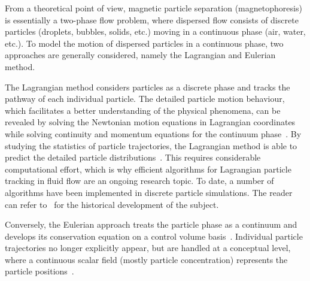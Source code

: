 From a theoretical point of view, magnetic particle separation (magnetophoresis) is essentially a two-phase flow problem, where dispersed flow consists of discrete particles (droplets, bubbles, solids, etc.) moving in a continuous phase (air, water, etc.). To model the motion of dispersed particles in a continuous phase, two approaches are generally considered, namely the Lagrangian and Eulerian method. 

The Lagrangian method considers particles as a discrete phase and tracks the pathway of each individual particle. The detailed particle motion behaviour, which facilitates a better understanding of the physical phenomena, can be revealed by solving the Newtonian motion equations in Lagrangian coordinates while solving continuity and momentum equations for the continuum phase~\cite{Rizk1993,Gidaspow1994}. By studying the statistics of particle trajectories, the Lagrangian method is able to predict the detailed particle distributions~\cite{Fluent2009,Fluent2009a}. This requires considerable computational effort, which is why efficient algorithms for Lagrangian particle tracking in fluid flow are an ongoing research topic. To date, a number of algorithms have been implemented in discrete particle simulations. The reader can refer to~\cite{Gouesbet1999,Lain2002,Stuart2011} for the historical development of the subject.

Conversely, the Eulerian approach treats the particle phase as a continuum and develops its conservation equation on a control volume basis~\cite{Csanady1963,Wells1983,Tu1995}. Individual particle trajectories no longer explicitly appear, but are handled at a conceptual level, where a continuous scalar field (mostly particle concentration) represents the particle positions~\cite{Fluent2009,Fluent2009a}. 

